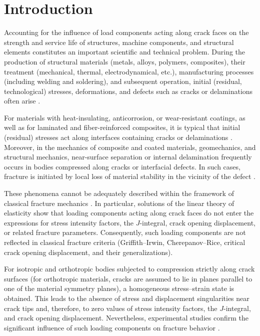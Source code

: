 \section{Introduction}

Accounting for the influence of load components acting along crack faces on the strength and service life of structures, machine components, and structural elements constitutes an important scientific and technical problem. During the production of structural materials (metals, alloys, polymers, composites), their treatment (mechanical, thermal, electrodynamical, etc.), manufacturing processes (including welding and soldering), and subsequent operation, initial (residual, technological) stresses, deformations, and defects such as cracks or delaminations often arise \cite{BogdanovGuz17,BogdanovGuz18,BogdanovGuz22,BogdanovGuz48,BogdanovGuz49,BogdanovGuz50,BogdanovGuz52,BogdanovGuz57,BogdanovGuz61}. 

For materials with heat-insulating, anticorrosion, or wear-resistant coatings, as well as for laminated and fiber-reinforced composites, it is typical that initial (residual) stresses act along interfaces containing cracks or delaminations \cite{BogdanovGuz20,BogdanovGuz56,BogdanovGuz57}. Moreover, in the mechanics of composite and coated materials, geomechanics, and structural mechanics, near-surface separation or internal delamination frequently occurs in bodies compressed along cracks or interfacial defects. In such cases, fracture is initiated by local loss of material stability in the vicinity of the defect \cite{BogdanovGuz13,BogdanovGuz28,BogdanovGuz41,BogdanovGuz45,BogdanovGuz55,BogdanovGuz65}.

These phenomena cannot be adequately described within the framework of classical fracture mechanics \cite{BogdanovGuz2,BogdanovGuz16,BogdanovGuz21}. In particular, solutions of the linear theory of elasticity show that loading components acting along crack faces do not enter the expressions for stress intensity factors, the $J$-integral, crack opening displacement, or related fracture parameters. Consequently, such loading components are not reflected in classical fracture criteria (Griffith--Irwin, Cherepanov--Rice, critical crack opening displacement, and their generalizations).

For isotropic and orthotropic bodies subjected to compression strictly along crack surfaces (for orthotropic materials, cracks are assumed to lie in planes parallel to one of the material symmetry planes), a homogeneous stress--strain state is obtained. This leads to the absence of stress and displacement singularities near crack tips and, therefore, to zero values of stress intensity factors, the $J$-integral, and crack opening displacement. Nevertheless, experimental studies confirm the significant influence of such loading components on fracture behavior \cite{BogdanovGuz1,BogdanovGuz12,BogdanovGuz42,BogdanovGuz47}.

